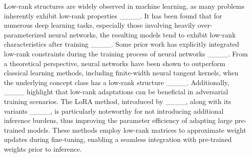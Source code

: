 Low-rank structures are widely observed in machine learning, as many problems inherently exhibit low-rank properties ____. It has been found that for numerous deep learning tasks, especially those involving heavily over-parameterized neural networks, the resulting models tend to exhibit low-rank characteristics after training ____. Some prior work has explicitly integrated low-rank constraints during the training process of neural networks ____. From a theoretical perspective, neural networks have been shown to outperform classical learning methods, including finite-width neural tangent kernels, when the underlying concept class has a low-rank structure ____. Additionally, ____ highlight that low-rank adaptations can be beneficial in adversarial training scenarios. The LoRA method, introduced by ____, along with its variants ____, is particularly noteworthy for not introducing additional inference burdens, thus improving the parameter efficiency of adapting large pre-trained models. These methods employ low-rank matrices to approximate weight updates during fine-tuning, enabling a seamless integration with pre-trained weights prior to inference.
